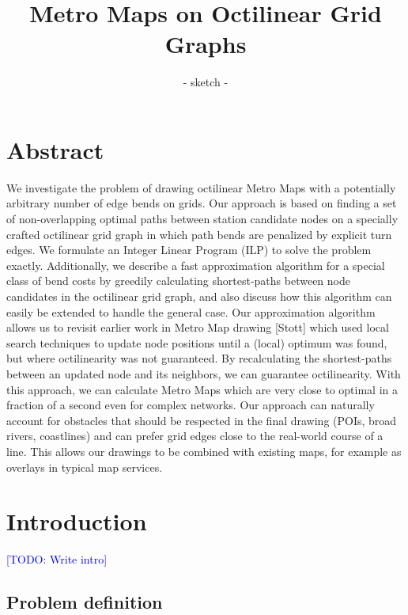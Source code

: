 \documentclass{sig-alternate-sigmod09}
\newcommand\TODO[1]{\textcolor{blue}{\small [TODO: #1]}}
\begin{document}
\title{Metro Maps on Octilinear Grid Graphs}
\subtitle{- sketch -}


\maketitle

\section{Abstract}

We investigate the problem of drawing octilinear Metro Maps with a potentially arbitrary number of edge bends on grids.
Our approach is based on finding a set of non-overlapping optimal paths between station candidate nodes on a specially crafted octilinear grid graph in which path bends are penalized by explicit turn edges.
We formulate an Integer Linear Program (ILP) to solve the problem exactly.
Additionally, we describe a fast approximation algorithm for a special class of bend costs by greedily calculating shortest-paths between node candidates in the octilinear grid graph, and also discuss how this algorithm can easily be extended to handle the general case.
Our approximation algorithm allows us to revisit earlier work in Metro Map drawing [Stott] which used local search techniques to update node positions until a (local) optimum was found, but where octilinearity was not guaranteed.
By recalculating the shortest-paths between an updated node and its neighbors, we can guarantee octilinearity.
With this approach, we can calculate Metro Maps which are very close to optimal in a fraction of a second even for complex networks.
Our approach can naturally account for obstacles that should be respected in the final drawing (POIs, broad rivers, coastlines) and can prefer grid edges  close to the real-world course of a line.
This allows our drawings to be combined with existing maps, for example as overlays in typical map services.


\section{Introduction}

\TODO{Write intro}

\subsection{Problem definition}
\end{document}
